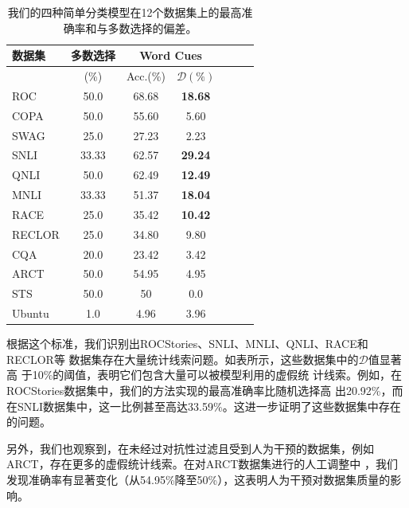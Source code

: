 \begin{table}[th]
    \small
    \centering
    \begin{tabular}{lcccccc}
    \toprule
    \textbf{数据集} &多数选择 & \multicolumn{2}{c}{Word Cues}  \\ \midrule
                                         & (\%)                 &  Acc.(\%) & $\mathcal{D}(\%)$ \\ \midrule
    ROC & 50.0            & 68.68          & \textbf{18.68}   \\
    COPA        & 50.0           & 55.60           &  5.60                \\
    SWAG       & 25.0           & 27.23           &   2.23                \\
    SNLI          & 33.33      & 62.57           &  \textbf{29.24}      \\
    QNLI         & 50.0           & 62.49            &  \textbf{12.49}   \\
    MNLI         & 33.33      & 51.37            &\textbf{18.04}        \\
    RACE        & 25.0          & 35.42            &   \textbf{10.42}   \\
    RECLOR       & 25.0           & 34.80            &   9.80   \\
    CQA          &20.0            & 23.42            &  3.42      \\
    ARCT        & 50.0            & 54.95           &  4.95      \\
    STS& 50.0           &50                 &0.0      \\
    Ubuntu   & 1.0               &4.96              &3.96      \\
    \bottomrule
    \end{tabular}
    \caption{\label{tab4:best_acc} 我们的四种简单分类模型在12个数据集上的最高准确率和与多数选择的偏差。}
    \end{table}

根据这个标准，我们识别出ROCStories、SNLI、MNLI、QNLI、RACE和RECLOR等
数据集存在大量统计线索问题。如表所示，这些数据集中的$\mathcal{D}$值显著高
于10\%的阈值，表明它们包含大量可以被模型利用的虚假统
计线索。例如，在ROCStories数据集中，我们的方法实现的最高准确率比随机选择高
出20.92\%，而在SNLI数据集中，这一比例甚至高达33.59\%。这进一步证明了这些数据集中存在的问题。

另外，我们也观察到，在未经过对抗性过滤且受到人为干预的数据集，例如
ARCT，存在更多的虚假统计线索。在对ARCT数据集进行的人工调整中
，我们发现准确率有显著变化（从54.95\%降至50\%），这表明人为干预对数据集质量的影响。
    
